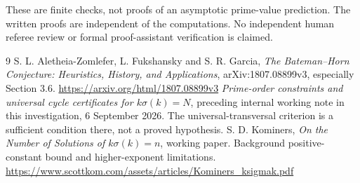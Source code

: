 \documentclass[11pt]{article}
\begin{document}
These are finite checks, not proofs of an asymptotic prime-value prediction. The written proofs are independent of the computations. No independent human referee review or formal proof-assistant verification is claimed.

\begin{thebibliography}{9}
 S. L. Aletheia-Zomlefer, L. Fukshansky and S. R. Garcia, \emph{The Bateman--Horn Conjecture: Heuristics, History, and Applications}, arXiv:1807.08899v3, especially Section 3.6.\newline
\url{https://arxiv.org/html/1807.08899v3}
 \emph{Prime-order constraints and universal cycle certificates for $k\sigma(k)=N$}, preceding internal working note in this investigation, 6 September 2026. The universal-transversal criterion is a sufficient condition there, not a proved hypothesis.
 S. D. Kominers, \emph{On the Number of Solutions of $k\sigma(k)=n$}, working paper. Background positive-constant bound and higher-exponent limitations.\newline
\url{https://www.scottkom.com/assets/articles/Kominers_ksigmak.pdf}
\end{thebibliography}
\end{document}
